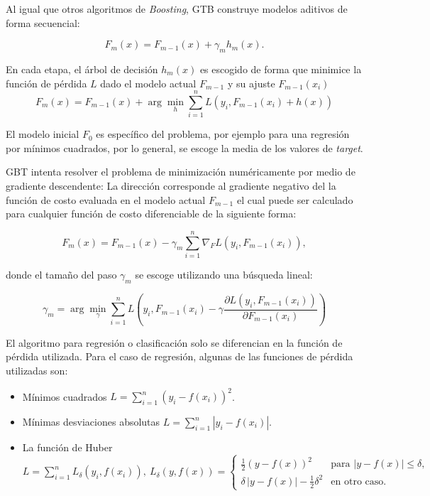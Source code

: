 \documentclass[spanish]{article}
\begin{document}
          Al igual que otros algoritmos de \emph{Boosting}, GTB construye modelos aditivos de forma secuencial:
          
          \begin{equation}
            F_m(x) = F_{m-1}(x) + \gamma_m h_m(x).
          \end{equation}
           
          En cada etapa, el árbol de decisión $h_m(x)$ es escogido de forma que minimice la función de pérdida 
          $L$ dado el modelo actual $F_{m-1}$ y su ajuste $F_{m-1}(x_i)$
          \begin{equation}
            F_m(x) = F_{m-1}(x) + \arg\min_{h} \sum_{i=1}^{n} L(y_i, F_{m-1}(x_i) + h(x))
          \end{equation}
           
          El modelo inicial $F_{0}$ es específico del problema, por ejemplo para una regresión por mínimos 
          cuadrados, por lo general, se escoge la media de los valores de \emph{target}. \medskip
          
          GBT intenta resolver el problema de minimización numéricamente por medio de gradiente descendente: 
          La dirección corresponde al gradiente  negativo del la función de costo evaluada en el modelo actual 
          $F_{m-1}$ el cual puede ser calculado para cualquier función de costo diferenciable de la siguiente forma:

          \begin{equation}
            F_m(x) = F_{m-1}(x) - \gamma_m \sum_{i=1}^{n} \nabla_F L(y_i, F_{m-1}(x_i)),
          \end{equation}
          
          donde el tamaño del paso $\gamma_m$ se escoge utilizando una búsqueda lineal:
          
          \begin{equation}
            \gamma_m = \arg\min_{\gamma} \sum_{i=1}^{n} L\left(y_i, F_{m-1}(x_i) - 
              \gamma \frac{\partial L(y_i, F_{m-1}(x_i))}{\partial F_{m-1}(x_i)}\right)
          \end{equation}
           
          El algoritmo para regresión o clasificación solo se diferencian en la función de pérdida utilizada. 
          Para el caso de regresión, algunas de las funciones de pérdida utilizadas son:
          \begin{itemize}
            \item Mínimos cuadrados $L = \sum_{i=1}^n (y_i - f(x_i))^2$.
            \item Mínimas desviaciones absolutas $L = \sum_{i=1}^n |y_i - f(x_i)|$.
            \item La función de Huber $L = \sum_{i=1}^n L_{\delta}(y_i, f(x_i)), ~ 
              L_{\delta }(y,f(x))=\begin{cases}{\frac  {1}{2}}(y-f(x))^{2} & {\textrm{para }}|y-f(x)|\leq 
              \delta ,\\ \delta \,|y-f(x)|-{\frac  {1}{2}}\delta ^{2} & {\textrm{en otro caso.}}\end{cases}$
          \end{itemize}
            
\end{document}
